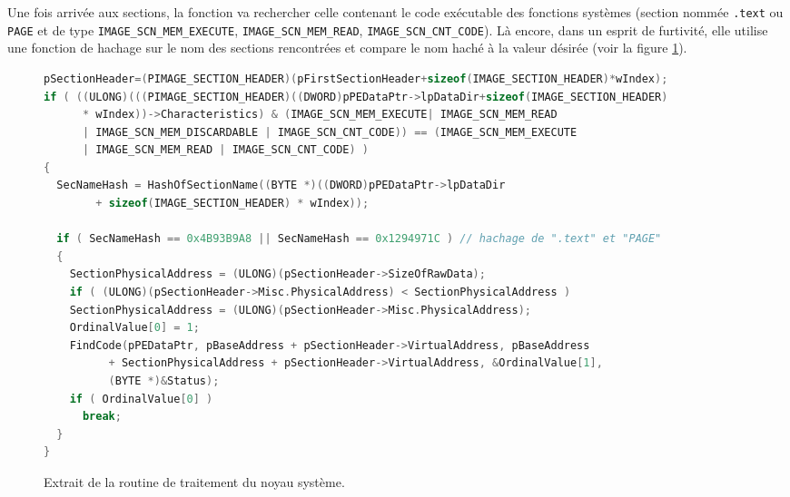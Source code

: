 Une fois arrivée aux sections, la fonction va rechercher celle contenant le code exécutable des fonctions systèmes (section nommée \texttt{.text} ou \texttt{PAGE} et de type \texttt{IMAGE\_SCN\_MEM\_EXECUTE}, \texttt{IMAGE\_SCN\_MEM\_READ}, \texttt{IMAGE\_SCN\_CNT\_CODE}). Là encore, dans un esprit de furtivité, elle utilise une fonction de hachage sur le nom des sections rencontrées et compare le nom haché à la valeur désirée (voir la figure \ref{fig:AThierry_kernel}). 
\begin{figure}
%             
\begin{changemargin}{-1cm}{-1cm}
\begin{lstlisting}[language={C}]
pSectionHeader=(PIMAGE_SECTION_HEADER)(pFirstSectionHeader+sizeof(IMAGE_SECTION_HEADER)*wIndex);
if ( ((ULONG)(((PIMAGE_SECTION_HEADER)((DWORD)pPEDataPtr->lpDataDir+sizeof(IMAGE_SECTION_HEADER) 
      * wIndex))->Characteristics) & (IMAGE_SCN_MEM_EXECUTE| IMAGE_SCN_MEM_READ 
      | IMAGE_SCN_MEM_DISCARDABLE | IMAGE_SCN_CNT_CODE)) == (IMAGE_SCN_MEM_EXECUTE
      | IMAGE_SCN_MEM_READ | IMAGE_SCN_CNT_CODE) )  
{
  SecNameHash = HashOfSectionName((BYTE *)((DWORD)pPEDataPtr->lpDataDir
		+ sizeof(IMAGE_SECTION_HEADER) * wIndex));

  if ( SecNameHash == 0x4B93B9A8 || SecNameHash == 0x1294971C ) // hachage de ".text" et "PAGE"
  {
    SectionPhysicalAddress = (ULONG)(pSectionHeader->SizeOfRawData);
    if ( (ULONG)(pSectionHeader->Misc.PhysicalAddress) < SectionPhysicalAddress )
	SectionPhysicalAddress = (ULONG)(pSectionHeader->Misc.PhysicalAddress);
    OrdinalValue[0] = 1;                                                            
    FindCode(pPEDataPtr, pBaseAddress + pSectionHeader->VirtualAddress, pBaseAddress 
	      + SectionPhysicalAddress + pSectionHeader->VirtualAddress, &OrdinalValue[1], 
	      (BYTE *)&Status);
    if ( OrdinalValue[0] )
      break;
  }
}
\end{lstlisting}
\end{changemargin}
\caption{Extrait de la routine de traitement du noyau système.\label{fig:AThierry_kernel}}
\end{figure}

